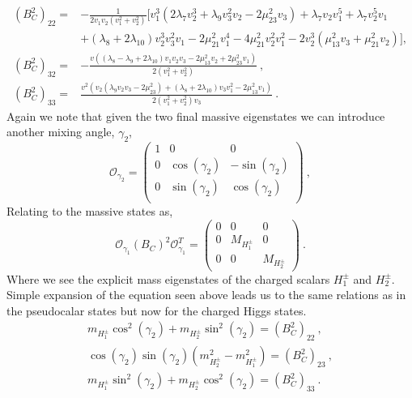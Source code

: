 \documentclass[10pt]{book}
\renewcommand{\(}{\left(}
\renewcommand{\)}{\right)}
\renewcommand{\[}{\left[}
\renewcommand{\]}{\right]}
\begin{document}
\begin{equation}
\begin{split}
\left( B^2_C \right)_{22} = & -\frac{1}{2 v_1 v_2 \left(v_1^2+v_2^2\right)} \Bigg[ v_1^3 \left(2 \lambda _7 v_2^3+\lambda _9 v_3^2 v_2-2 \mu _{23}^2 v_3\right)+\lambda _7 v_2 v_1^5+\lambda _7 v_2^5 v_1 \\ & +\left(\lambda _8+2 \lambda _{10}\right) v_2^3 v_3^2 v_1-2 \mu _{21}^2 v_1^4-4 \mu _{21}^2 v_2^2 v_1^2-2 v_2^3 \left(\mu _{13}^2 v_3+\mu _{21}^2 v_2\right) \Bigg] ,  
%
\\
%
\left( B^2_C \right)_{32}  = &  -\frac{v \left(\left(\lambda _8-\lambda _9+2 \lambda _{10}\right) v_1 v_2 v_3-2 \mu _{13}^2 v_2+2 \mu _{23}^2 v_1\right)}{2 \left(v_1^2+v_2^2\right)} \ ,
%
\\
%
\left( B^2_C \right)_{33}  = & \frac{v^2 \left(v_2 \left(\lambda _9 v_2 v_3-2 \mu _{23}^2\right)+\left(\lambda _8+2 \lambda _{10}\right) v_3 v_1^2-2 \mu _{13}^2 v_1\right)}{2 \left(v_1^2+v_2^2\right) v_3} \ . 
%
\end{split} 
\end{equation}
Again we note that given the two final massive eigenstates we can introduce another mixing angle, $\gamma_2$, 
%
\begin{equation}
\mathcal{O}_{\gamma_2} = \begin{pmatrix}
1 & 0 & 0 \\
0 & \cos(\gamma_2) & -\sin(\gamma_2) \\ 
0 & \sin(\gamma_2) & \cos(\gamma_2) \\
\end{pmatrix} \ ,
\end{equation}
Relating to the massive states as, 
\begin{equation}
\mathcal{O}_{\gamma_1} \left( B_C \right)^2 \mathcal{O}_{\gamma_1}^T   = \begin{pmatrix}
0 & 0 & 0 \\ 
0 & M_{H_1^\pm} & 0 \\ 
0 & 0 & M_{H_2^\pm}  
\end{pmatrix} \ .
\end{equation}
%
Where we see the explicit mass eigenstates of the charged scalars $H^\pm_1$ and $H^\pm_2$. 
%
Simple expansion of the equation seen above leads us to the same relations as in the pseudocalar states but now for the charged Higgs states. 
\begin{equation}
\begin{split}
m_{H^\pm_1} \cos^2(\gamma_2) + m_{H^\pm_2}  \sin^2(\gamma_2) = \left( B_C^2 \right)_{22}  \ ,   \\
\cos(\gamma_2)\sin(\gamma_2)( m_{H^\pm_2}^2 - m_{H^\pm_1}^2  )  = \left( B_C^2 \right)_{23} \ , \\ 
m_{H^\pm_1} \sin^2(\gamma_2) + m_{H^\pm_2}  \cos^2(\gamma_2) = \left( B_C^2 \right)_{33} \ . 
\end{split} 
\end{equation}
\end{document}
